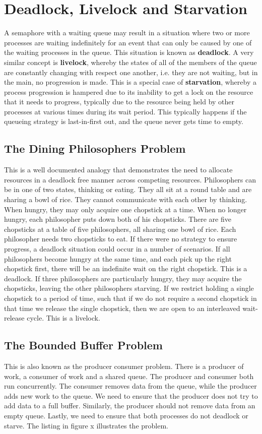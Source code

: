 \documentclass[10pt,a4paper]{article}
\begin{document}
\section{Deadlock, Livelock and Starvation}
A semaphore with a waiting queue may result in a situation where two or more processes are waiting indefinitely for an event that can only be caused by one of the waiting processes in the queue. This situation is known as {\bf deadlock}. A very similar concept is {\bf livelock}, whereby the states of all of the members of the queue are constantly changing with respect one another, i.e. they are not waiting, but in the main, no progression is made. This is a special case of {\bf starvation}, whereby a process progression is hampered due to its inability to get a lock on the resource that it needs to progress, typically due to the resource being held by other processes at various times during its wait period. This typically happens if the queueing strategy is last-in-first out, and the queue never gets time to empty. 
\subsection{The Dining Philosophers Problem}
This is a well documented analogy that demonstrates the need to allocate resources in a deadlock free manner across competing resources. Philosophers  can be in one of two states, thinking or eating. They all sit at a round table and are sharing a bowl of rice. They cannot communicate with each other by thinking. When hungry, they may only acquire one chopstick at a time. When no longer hungry, each philosopher puts down both of his chopsticks. There are five chopsticks at a table of five philosophers, all sharing one bowl of rice. Each philosopher needs two chopsticks to eat. If there were no strategy to ensure progress, a deadlock situation could occur in a number of scenarios. If all philosophers become hungry at the same time, and each pick up the right chopstick first, there will be an indefinite wait on the right chopstick. This is a deadlock. If three philosophers are particularly hungry, they may acquire the chopsticks, leaving the other philosophers starving. If we restrict holding a single chopstick to a period of time, such that if we do not require a second chopstick in that time we release the single chopstick, then we are open to an interleaved wait-release cycle. This is a livelock. 
\subsection{The Bounded Buffer Problem}
This is also known as the producer consumer problem. There is a producer of work, a consumer of work and a shared queue. The producer and consumer both run concurrently. The consumer removes data from the queue, while the producer adds new work to the queue. We need to ensure that the producer does not try to add data to a full buffer. Similarly, the producer should not remove data from an empty queue. Lastly, we need to ensure that both processes do not deadlock or starve. The listing in figure x illustrates the problem. 
\end{document}
